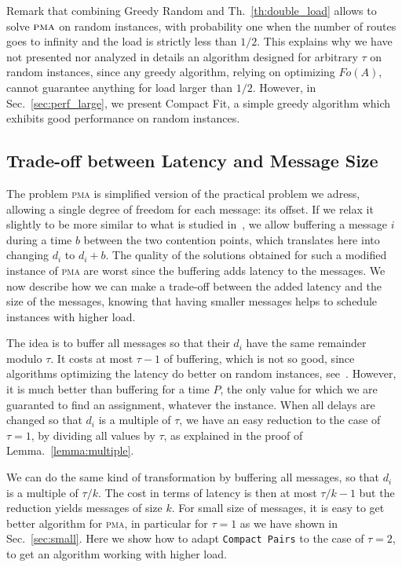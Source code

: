 \documentclass[a4paper,cleveref, autoref, thm-restate,UKenglish]{lipics-v2019}
\newcommand\pma{\textsc{pma}\xspace}
\newcommand\compactpair{\texttt{Compact Pairs}\xspace}
\begin{document}
Remark that combining Greedy Random and Th.~\ref{th:double_load} allows to solve $\pma$ on random instances,
with probability one when the number of routes goes to infinity and the load is strictly less than $1/2$. 
This explains why we have not presented nor analyzed in details an algorithm designed for arbitrary $\tau$ on random instances, since any greedy algorithm, relying on optimizing $Fo(A)$, cannot guarantee anything for load larger than $1/2$.
However, in Sec.~\ref{sec:perf_large}, we present Compact Fit, a simple greedy algorithm which exhibits good performance on random instances.

\subsection{Trade-off between Latency and Message Size}

The problem \pma is simplified version of the practical problem we adress, allowing a single degree of freedom for each message: its offset. If we relax it slightly to be more similar to what is studied in~\cite{barth2018deterministic}, we allow buffering a message $i$ during a time $b$ between the two contention points, which translates here into changing $d_i$ to $d_i + b$. The quality of the solutions obtained for such a modified instance of \pma are worst since the buffering adds latency to the messages. We now describe how we can make a trade-off between the added latency and the size of the messages, knowing that having smaller messages helps to schedule instances with higher load.


The idea is to buffer all messages so that their $d_i$ have the same
remainder modulo $\tau$. It costs at most $\tau - 1$ of buffering, which is not
so good, since algorithms optimizing the latency do better on random instances, see~\cite{barth2018deterministic}. However, it is much better than buffering for a time $P$, the only value for which we are guaranted to find an assignment, whatever the instance. When all delays are changed so that $d_i$ is a multiple of $\tau$, we have an easy reduction to the case of $\tau = 1$, by dividing all values by $\tau$, as explained in the proof of Lemma.~\ref{lemma:multiple}.


We can do the same kind of transformation by buffering all messages, so that $d_i$ is a multiple of $\tau / k$. The cost in terms of latency is then at most $\tau / k - 1$ but the reduction yields messages of size $k$.
For small size of messages, it is easy to get better algorithm for \pma, in particular for $\tau = 1$ as we have shown in Sec.~\ref{sec:small}. Here we show how to adapt \compactpair to the case of $\tau = 2$, to get an algorithm working with higher load.
\end{document}
